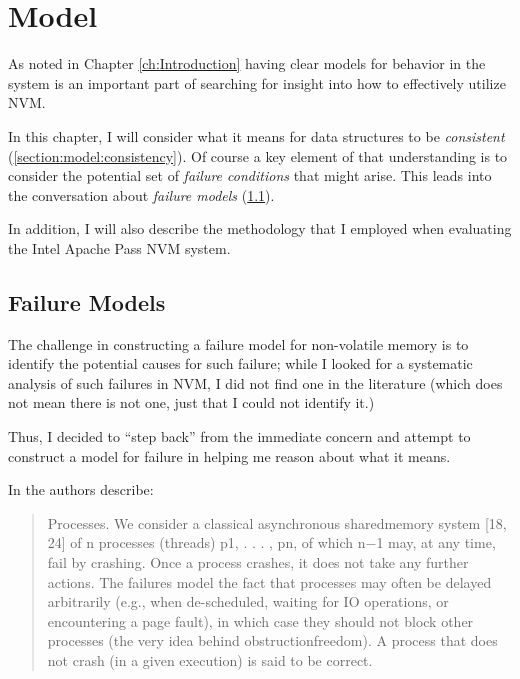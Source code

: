 
\chapter{Model}
\label{ch:Model}

As noted in Chapter \ref{ch:Introduction} having clear models for behavior in the system
is an important part of searching for insight into how to effectively utilize \acs{NVM}.

In this chapter, I will consider what it means for data structures to be \textit{consistent} (\ref{section:model:consistency}).
Of course a key element of that understanding is to consider the potential set of \textit{failure conditions} that might arise.
This leads into the conversation about \textit{failure models} (\ref{section:model:failure}).

In addition, I will also describe the methodology that I employed when evaluating the Intel Apache Pass
\acs{NVM} system. 

\section{Failure Models}\label{section:model:failure}

The challenge in constructing a failure model for non-volatile memory is to identify the potential causes for such failure;
while I looked for a systematic analysis of such failures in \acs{NVM}, I did not find one in the literature (which does not
mean there is not one, just that I could not identify it.)

Thus, I decided to ``step back'' from the immediate concern and attempt to construct a model for failure
in helping me reason about what it means.

In \cite{guerraoui2008obstruction} the authors describe:

\begin{quotation}
    Processes. We consider a classical asynchronous sharedmemory
    system [18, 24] of n processes (threads) p1, . . . , pn,
    of which n−1 may, at any time, fail by crashing. Once a process
    crashes, it does not take any further actions. The failures
    model the fact that processes may often be delayed arbitrarily
    (e.g., when de-scheduled, waiting for IO operations,
    or encountering a page fault), in which case they should
    not block other processes (the very idea behind obstructionfreedom).
    A process that does not crash (in a given execution)
    is said to be correct.
\end{quotation}

